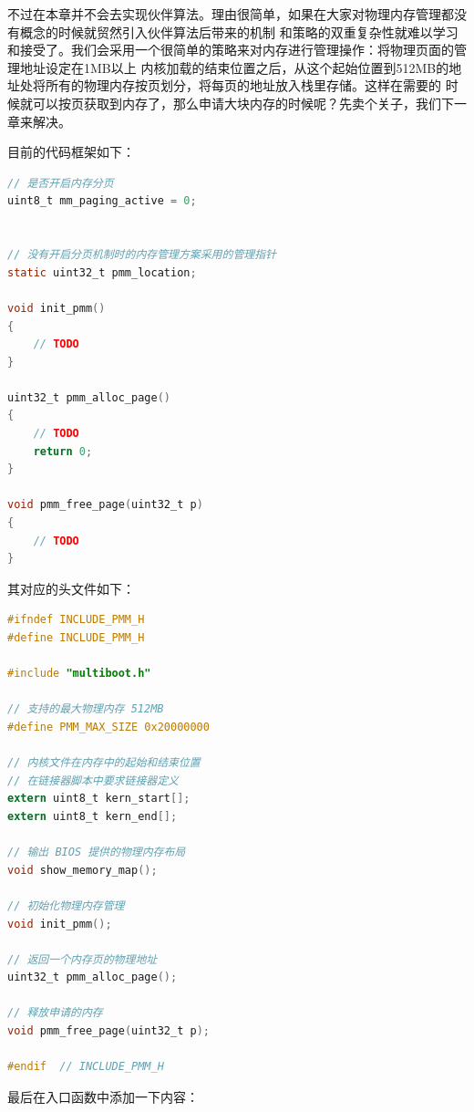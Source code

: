 \par 不过在本章并不会去实现伙伴算法。理由很简单，如果在大家对物理内存管理都没有概念的时候就贸然引入伙伴算法后带来的机制\allowbreak
和策略的双重复杂性就难以学习和接受了。我们会采用一个很简单的策略来对内存进行管理操作：将物理页面的管理地址设定在1MB以上\allowbreak
内核加载的结束位置之后，从这个起始位置到512MB的地址处将所有的物理内存按页划分，将每页的地址放入栈里存储。这样在需要的\allowbreak
时候就可以按页获取到内存了，那么申请大块内存的时候呢？先卖个关子，我们下一章来解决。

\par 目前的代码框架如下：

\begin{lstlisting}[language = C, caption = mm/pmm.c]
// 是否开启内存分页
uint8_t mm_paging_active = 0;


// 没有开启分页机制时的内存管理方案采用的管理指针
static uint32_t pmm_location;

void init_pmm()
{
	// TODO
}

uint32_t pmm_alloc_page()
{
	// TODO
	return 0;
}

void pmm_free_page(uint32_t p)
{
	// TODO
}

\end{lstlisting}

\par 其对应的头文件如下：

\begin{lstlisting}[language = C, caption = include/pmm.h]
#ifndef INCLUDE_PMM_H
#define INCLUDE_PMM_H

#include "multiboot.h"

// 支持的最大物理内存 512MB
#define PMM_MAX_SIZE 0x20000000

// 内核文件在内存中的起始和结束位置
// 在链接器脚本中要求链接器定义
extern uint8_t kern_start[];
extern uint8_t kern_end[];

// 输出 BIOS 提供的物理内存布局
void show_memory_map();

// 初始化物理内存管理
void init_pmm();

// 返回一个内存页的物理地址
uint32_t pmm_alloc_page();

// 释放申请的内存
void pmm_free_page(uint32_t p);

#endif 	// INCLUDE_PMM_H
\end{lstlisting}

\par 最后在入口函数中添加一下内容：

